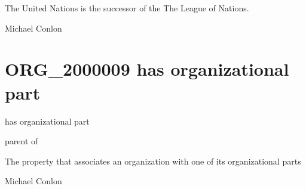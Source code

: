 \documentclass[letterpaper,10pt,english]{sphinxmanual}
\begin{document}
\begin{sphinxShadowBox}

\sphinxAtStartPar
The United Nations is the successor of the The League of Nations.
\end{sphinxShadowBox}

\begin{sphinxShadowBox}

\sphinxAtStartPar
Michael Conlon 
\end{sphinxShadowBox}
\begin{quote}
\label{\detokenize{doc-ORG_2000009:org-2000009}}\label{\detokenize{doc-ORG_2000009:has-organizational-part}}\label{\detokenize{doc-ORG_2000009:org-2000009}}
\ignorespaces \end{quote}


\section{ORG\_2000009 \sphinxhyphen{} has organizational part}
\label{\detokenize{doc-ORG_2000009:org-2000009-has-organizational-part}}\label{\detokenize{doc-ORG_2000009:index-0}}\label{\detokenize{doc-ORG_2000009::doc}}
\begin{sphinxShadowBox}

\sphinxAtStartPar
has organizational part
\end{sphinxShadowBox}

\begin{sphinxShadowBox}

\sphinxAtStartPar
parent of
\end{sphinxShadowBox}

\begin{sphinxShadowBox}

\sphinxAtStartPar
The property that associates an organization with one of its organizational parts
\end{sphinxShadowBox}

\begin{sphinxShadowBox}

\sphinxAtStartPar
Michael Conlon 
\end{sphinxShadowBox}
\end{document}
